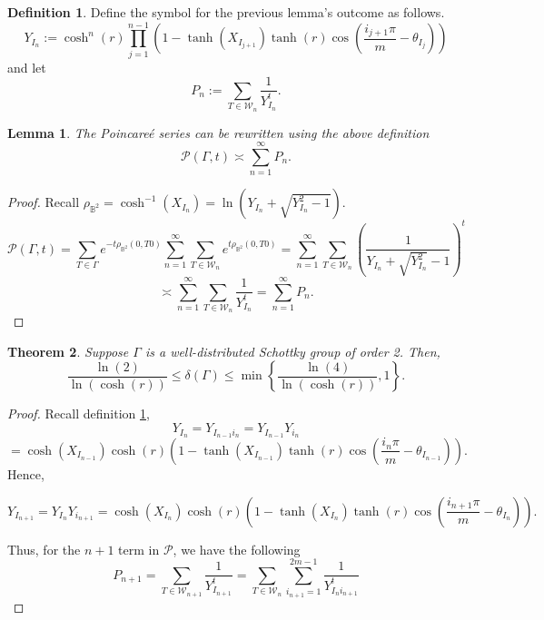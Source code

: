 \documentclass[12pt,oneside]{sfsuthesis}
\theoremstyle{plain} %
\newtheorem{theorem}{Theorem}[chapter]
\newtheorem{lemma}[theorem]{Lemma}
\theoremstyle{definition}  %
\newtheorem{definition}{Definition}[chapter]
\theoremstyle{remark}  %
\theoremstyle{plain}
\begin{document}
{\begin{definition}\label{PY}
Define the symbol for the previous lemma's outcome as follows.
$$
Y_{I_n}:=\cosh^n\left(r\right)\prod_{j=1}^{n-1}\left(1-\tanh\left(X_{I_{j+1}}\right)\tanh\left(r\right)\cos\left(\frac{i_{j+1}\pi}{m}-\theta_{I_j}\right)\right)
$$
and let
$$
P_n:=\sum_{T\in\mathcal{W}_n}\frac{1}{Y_{I_n}^t}.
$$
\end{definition}
\begin{lemma}
The Poincare\'{e} series can be rewritten using the above definition
$$
\mathcal{P}\left(\Gamma,t\right)\asymp \sum_{n=1}^\infty P_n.
$$
\end{lemma}
\begin{proof}
Recall $\rho_{\mathbb{B}^2}=\cosh^{-1}\left(X_{I_{n}}\right)= \ln\left(Y_{I_n}+\sqrt{Y_{I_n}^2-1}\right).$
$$
\mathcal{P}\left(\Gamma,t\right)=\sum_{T\in\Gamma}e^{-t\rho_{\mathbb{B}^2}\left(0,T0\right)}
\sum_{n=1}^\infty\sum_{T\in \mathcal{W}_n}e^{t\rho_{\mathbb{B}^2}\left(0,T0\right)}=\sum_{n=1}^\infty\sum_{T\in \mathcal{W}_n}\left(\frac{1}{Y_{I_n}+\sqrt{Y_{I_n}^2}-1} \right)^t
$$
$$
\asymp \sum_{n=1}^\infty\sum_{T\in \mathcal{W}_n}\frac{1}{Y_{I_n}^t}=\sum_{n=1}^\infty P_n.
$$
\end{proof}
\begin{theorem}
Suppose $\Gamma$ is a well-distributed Schottky group of order 2. Then, 
$$
\frac{\ln\left( 2\right)}{\ln\left(\cosh\left(r\right)\right)}\leq \delta\left(\Gamma\right)\leq
\min\left\lbrace \frac{\ln\left(4\right)}{\ln\left(\cosh\left(r\right)\right)},1\right\rbrace.
$$
\end{theorem}
\begin{proof}
Recall definition \ref{PY}, 
$$
Y_{I_n}=Y_{I_{n-1}i_n}=Y_{I_{n-1}} Y_{i_n}
$$
$$=\cosh\left(X_{I_{n-1}}\right)\cosh\left( r\right)\left( 1- \tanh\left(X_{I_{n-1}}\right)\tanh\left(r\right)\cos\left( \frac{i_n\pi}{m}-\theta_{I_{n-1}}\right)\right).
$$
Hence, 
\begin{small}
$$
Y_{I_{n+1}}=Y_{I_{n}} Y_{i_{n+1}}=\cosh\left(X_{I_{n}}\right)\cosh\left( r\right)\left( 1- \tanh\left(X_{I_{n}}\right)\tanh\left(r\right)\cos\left( \frac{i_{n+1}\pi}{m}-\theta_{I_{n}}\right)\right).
$$
\end{small}
Thus, for the $n+1$ term in $\mathcal{P}$, we have the following
$$
P_{n+1}=\sum_{T\in\mathcal{W}_{n+1}}\frac{1}{Y_{I_{n+1}}^t}=\sum_{T\in\mathcal{W}_n}\sum_{i_{n+1}=1}^{2m-1}\frac{1}{Y_{I_{n}i_{n+1}}^t}
$$



\end{proof}}
\end{document}

